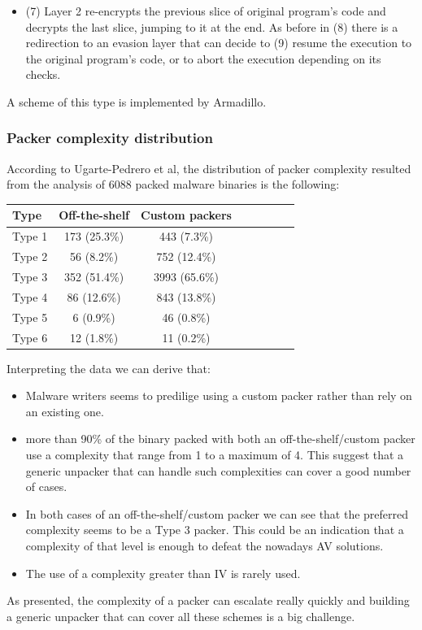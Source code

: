 \begin{itemize}
\item (7) Layer 2 re-encrypts the previous slice of original program's code and decrypts the last slice, jumping to it at the end. As before in (8) there is a redirection to an evasion layer that can decide to (9) resume the execution to the original program's code, or to abort the execution depending on its checks.
\end{itemize}

A scheme of this type is implemented by Armadillo.

\subsubsection{Packer complexity distribution}

According to Ugarte-Pedrero et al\cite{sokpacker}, the distribution of packer complexity resulted from the analysis of 6088 packed malware binaries is the following:

\begin{table}[H]
\begin{center}
\begin{tabular}{l*{6}{c}r}
Type      & Off-the-shelf & Custom packers \\
\hline
Type 1 &       173 (25.3\%) & 443 (7.3\%) \\
Type 2 &       56 (8.2\%) & 752 (12.4\%) \\
Type 3 &       352 (51.4\%)  & 3993 (65.6\%) \\
Type 4 &       86 (12.6\%) & 843 (13.8\%) \\
Type 5 &       6 (0.9\%)  & 46 (0.8\%) \\
Type 6 &       12 (1.8\%) & 11 (0.2\%) \\
\end{tabular}
\end{center}
\end{table}

Interpreting the data we can derive that:
\begin{itemize}
\item Malware writers seems to predilige using a custom packer rather than rely on an existing one.
\item more than 90\% of the binary packed with both an off-the-shelf/custom packer use a complexity that range from 1 to a maximum of 4. This suggest that a generic unpacker that can handle such complexities can cover a good number of cases. 
\item In both cases of an off-the-shelf/custom packer we can see that the preferred complexity seems to be a Type 3 packer. This could be an indication that a complexity of that level is enough to defeat the nowadays AV solutions.
\item The use of a complexity greater than IV is rarely used.
\end{itemize}
As presented, the complexity of a packer can escalate really quickly and building a generic unpacker that can cover all these schemes is a big challenge.

